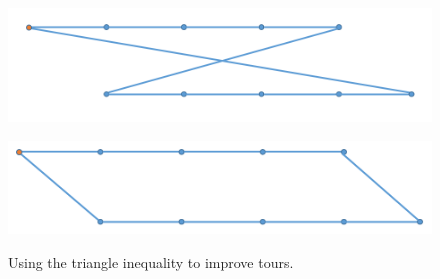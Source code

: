 \begin{figure}
\centering
\begin{minipage}{.5\textwidth}
  \centering
  \includegraphics[width=.48\linewidth]{Chapters/MultiAgentCoverage/Figs/crossingSegments.PNG}
  \label{fig:crossingTour}
\end{minipage}%
\begin{minipage}{.5\textwidth}
  \centering
  \includegraphics[width=.48\linewidth]{Chapters/MultiAgentCoverage/Figs/nonCrossingSegments.png}
  \label{fig:nonCrossingTour}
\end{minipage}
\caption{Using the triangle inequality to improve tours.}
\label{fig:fixingTourCrossing}
\end{figure}























